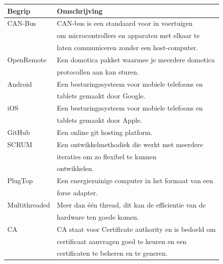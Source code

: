 \documentclass[]{article}
\begin{document}
\begin{longtable}{|| l | l ||}\hline
    Begrip           & Omschrijving                                         \\\hline\hline
    CAN-Bus          & CAN-bus is een standaard voor in voertuigen          \\
                     & om microcontrollers en apparaten met elkaar te       \\
                     & laten communiceren zonder een host-computer.        \\\hline
    OpenRemote       & Een domotica pakket waarmee je meerdere domotica     \\
                     & protocollen aan kan sturen.                          \\\hline
    Android          & Een besturingssysteem voor mobiele telefoons en      \\
                     & tablets gemaakt door Google.                         \\\hline
    iOS              & Een besturingssysteem voor mobiele telefoons en      \\
                     & tablets gemaakt door Apple.                          \\\hline
    GitHub           & Een online git hosting platform.                     \\\hline
    SCRUM            & Een ontwikkelmethodiek die werkt met meerdere        \\
                     & iteraties om zo flexibel te kunnen                   \\
                     & ontwikkelen.                                         \\\hline
    PlugTop          & Een energiezuinige computer in het formaat van een   \\
                     & forse adapter.                                       \\\hline
    Multithreaded    & Meer dan \'e\'en thread, dit kan de efficientie van de   \\
                     & hardware ten goede komen.                            \\\hline
    CA               & CA staat voor Certificate authority en is bedoeld om \\
                     & certificaat aanvragen goed te keuren en een          \\
                     & certificaten te beheren en te generen.               \\\hline

\end{longtable}
\end{document}
